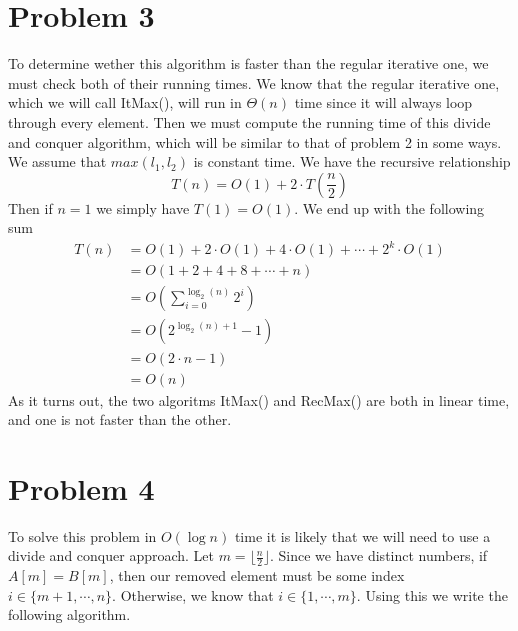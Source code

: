 \documentclass{article}
\begin{document}
\section*{Problem 3}
To determine wether this algorithm is faster than the regular iterative one, we must check
both of their running times. We know that the regular iterative one, which we will call ItMax(),
will run in $\Theta (n)$ time since it will always loop through every element.
Then we must compute the running time of this divide and conquer algorithm, which will be similar
to that of problem 2 in some ways. We assume that $max(l_1, l_2)$ is constant time. We have the
recursive relationship
\[
    T(n) = O(1) + 2 \cdot T\left(\frac{n}{2}\right)
\]
Then if $n = 1$ we simply have $T(1) = O(1)$. We end up with the following sum
\begin{align*}
    T(n) &= O(1) + 2 \cdot O(1) + 4 \cdot O(1) + \cdots + 2^k \cdot O(1)\\
    &= O(1 + 2 + 4 + 8 + \cdots + n)\\
    &= O\left(\sum_{i=0}^{\log_2(n)} 2^i \right)\\
    &= O\left(2^{\log_2(n) + 1} - 1\right)\\
    &= O(2 \cdot n - 1)\\
    &= O(n)
\end{align*}
As it turns out, the two algoritms ItMax() and RecMax() are both in linear time, and one is not faster than the other.

\section*{Problem 4}
To solve this problem in $O(\log n)$ time it is likely that we will need
to use a divide and conquer approach. Let $m = \lfloor \frac{n}{2} \rfloor$.
Since we have distinct numbers, if $A[m] = B[m]$, then our removed element
must be some index $i \in \{m+1, \cdots, n\}$. Otherwise, we know that
$i \in \{1, \cdots, m\}$. Using this we write the following algorithm.
\end{document}
